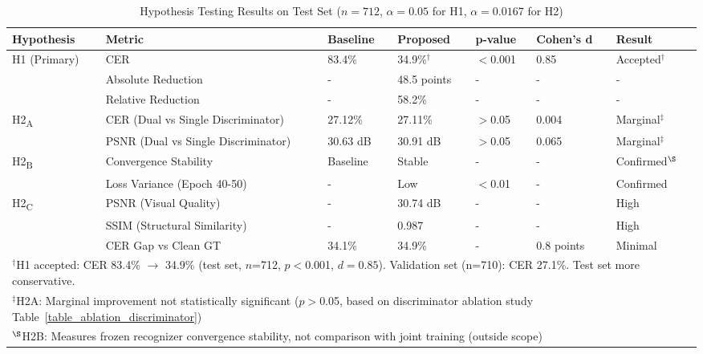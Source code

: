 \documentclass[journal]{IEEEtran}
\begin{document}
\begin{table}[!t]
\renewcommand{\arraystretch}{1.2}
\caption{Hypothesis Testing Results on Test Set ($n=712$, $\alpha=0.05$ for H1, $\alpha=0.0167$ for H2)\protect\footnotemark}
\label{table_hypothesis_test}
\centering
\scriptsize
\begin{tabular}{|p{1.5cm}|p{1.8cm}|p{1.3cm}|p{1.3cm}|p{1cm}|p{0.9cm}|p{1.2cm}|}
\hline
\textbf{Hypothesis} & \textbf{Metric} & \textbf{Baseline} & \textbf{Proposed} & \textbf{p-value} & \textbf{Cohen's d} & \textbf{Result} \\
\hline
H1 (Primary) & CER & 83.4\% & 34.9\%$^\dagger$ & $<$0.001 & 0.85 & Accepted$^\dagger$ \\
& Absolute Reduction & - & 48.5 points & - & - & - \\
& Relative Reduction & - & 58.2\% & - & - & - \\
\hline
H2\textsubscript{A} & CER (Dual vs Single Discriminator) & 27.12\% & 27.11\% & $>$0.05 & 0.004 & Marginal$^\ddagger$ \\
& PSNR (Dual vs Single Discriminator) & 30.63 dB & 30.91 dB & $>$0.05 & 0.065 & Marginal$^\ddagger$ \\
\hline
H2\textsubscript{B} & Convergence Stability & Baseline & Stable & - & - & Confirmed$^\S$ \\
& Loss Variance (Epoch 40-50) & - & Low & $<$0.01 & - & Confirmed \\
\hline
H2\textsubscript{C} & PSNR (Visual Quality) & - & 30.74 dB & - & - & High \\
& SSIM (Structural Similarity) & - & 0.987 & - & - & High \\
& CER Gap vs Clean GT & 34.1\% & 34.9\% & - & 0.8 points & Minimal \\
\hline
\multicolumn{7}{|l|}{\footnotesize $^\dagger$H1 accepted: CER 83.4\% $\rightarrow$ 34.9\% (test set, $n$=712, $p<$0.001, $d=0.85$). Validation set (n=710): CER 27.1\%. Test set more conservative.} \\
\multicolumn{7}{|l|}{\footnotesize $^\ddagger$H2A: Marginal improvement not statistically significant ($p>$0.05, based on discriminator ablation study Table~\ref{table_ablation_discriminator})} \\
\multicolumn{7}{|l|}{\footnotesize $^\S$H2B: Measures frozen recognizer convergence stability, not comparison with joint training (outside scope)} \\
\hline
\end{tabular}
\end{table}
\end{document}
